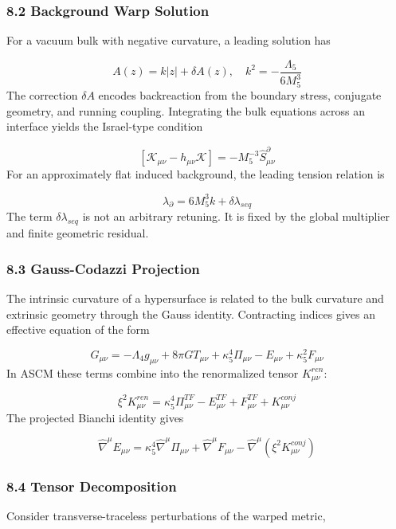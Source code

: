 \documentclass[aps,prd,onecolumn,superscriptaddress,nofootinbib,longbibliography,10pt]{revtex4-2}
\begin{document}
  
\subsubsection*{8.2 Background Warp Solution}

  For a vacuum bulk with negative curvature, a leading solution has


  \[ A(z) = k|z| + \delta A(z), \quad k^2 = -\frac{\Lambda_5}{6M_5^3} \]
  The correction \(\delta A\) encodes backreaction from the boundary stress, conjugate geometry, and running coupling. Integrating the bulk equations across an interface yields the Israel-type condition


  \[ [\mathcal{K}_{\mu\nu} - h_{\mu\nu}\mathcal{K}] = -M_5^{-3} \hat{S}^\partial_{\mu\nu} \]
  For an approximately flat induced background, the leading tension relation is


  \[ \lambda_\partial = 6M_5^3 k + \delta\lambda_{seq} \]
  The term \(\delta\lambda_{seq}\) is not an arbitrary retuning. It is fixed by the global multiplier and finite geometric residual.



  
\subsubsection*{8.3 Gauss-Codazzi Projection}

  The intrinsic curvature of a hypersurface is related to the bulk curvature and extrinsic geometry through the Gauss identity. Contracting indices gives an effective equation of the form


  \[ G_{\mu\nu} = -\Lambda_4 g_{\mu\nu} + 8\pi G T_{\mu\nu} + \kappa_5^4 \Pi_{\mu\nu} - E_{\mu\nu} + \kappa_5^2 F_{\mu\nu} \]
  In ASCM these terms combine into the renormalized tensor \(K^{ren}_{\mu\nu}\):


  \[ \xi^2 K^{ren}_{\mu\nu} = \kappa_5^4 \Pi^{TF}_{\mu\nu} - E^{TF}_{\mu\nu} + F^{TF}_{\mu\nu} + K^{conj}_{\mu\nu} \]
  The projected Bianchi identity gives


  \[ \hat{\nabla}^\mu E_{\mu\nu} = \kappa_5^4 \hat{\nabla}^\mu \Pi_{\mu\nu} + \hat{\nabla}^\mu F_{\mu\nu} - \hat{\nabla}^\mu (\xi^2 K^{conj}_{\mu\nu}) \]

  
\subsubsection*{8.4 Tensor Decomposition}

  Consider transverse-traceless perturbations of the warped metric,
\end{document}
